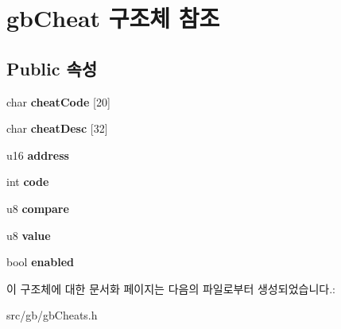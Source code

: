 \hypertarget{structgb_cheat}{}\section{gb\+Cheat 구조체 참조}
\label{structgb_cheat}
\subsection*{Public 속성}
\begin{DoxyCompactItemize}
\item 
\mbox{\label{structgb_cheat_ae91f81b3b07bd842606880b4fb1a74a8}} 
char {\bfseries cheat\+Code} \mbox{[}20\mbox{]}
\item 
\mbox{\label{structgb_cheat_aeddcedaba8d5c8f0a9c6eb4903a321fa}} 
char {\bfseries cheat\+Desc} \mbox{[}32\mbox{]}
\item 
\mbox{\label{structgb_cheat_a9cd0d16b2f8cfad6408130d037181559}} 
u16 {\bfseries address}
\item 
\mbox{\label{structgb_cheat_ab501c0fb95ea8338237734ec8e2fc981}} 
int {\bfseries code}
\item 
\mbox{\label{structgb_cheat_aae5ac2290ab371e369b8c11789b5d7f9}} 
u8 {\bfseries compare}
\item 
\mbox{\label{structgb_cheat_acabb64808f69357b955b5c9f464c9cc1}} 
u8 {\bfseries value}
\item 
\mbox{\label{structgb_cheat_af45ed85e44d6d20c3f0f9be2e2fd8c3b}} 
bool {\bfseries enabled}
\end{DoxyCompactItemize}


이 구조체에 대한 문서화 페이지는 다음의 파일로부터 생성되었습니다.\+:\begin{DoxyCompactItemize}
\item 
src/gb/gb\+Cheats.\+h\end{DoxyCompactItemize}
